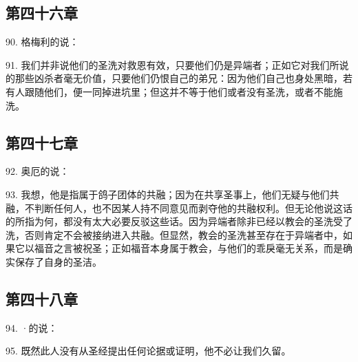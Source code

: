 \subsection{第四十六章}

90. 格梅利的说：\par

91. 我们并非说他们的圣洗对救恩有效，只要他们仍是异端者；正如它对我们所说的那些凶杀者毫无价值，只要他们仍恨自己的弟兄：因为他们自己也身处黑暗，若有人跟随他们，便一同掉进坑里；但这并不等于他们或者没有圣洗，或者不能施洗。\par


\subsection{第四十七章}

92. 奥厄的说：\par

93. 我想，他是指属于鸽子团体的共融；因为在共享圣事上，他们无疑与他们共融，不判断任何人，也不因某人持不同意见而剥夺他的共融权利。但无论他说这话的所指为何，都没有太大必要反驳这些话。因为异端者除非已经以教会的圣洗受了洗，否则肯定不会被接纳进入共融。但显然，教会的圣洗甚至存在于异端者中，如果它以福音之言被祝圣；正如福音本身属于教会，与他们的乖戾毫无关系，而是确实保存了自身的圣洁。\par


\subsection{第四十八章}

94. ·的说：\par

95. 既然此人没有从圣经提出任何论据或证明，他不必让我们久留。\par

